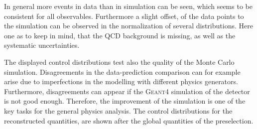 In general more events in data than in simulation can be seen, which seems to be consistent for all observables. Furthermore a slight offset, of the data points to the simulation can be observed in the normalization of several distributions.    
Here one as to keep in mind, that the QCD background is missing, as well as the systematic uncertainties.


The displayed control distributions test also the quality of the Monte Carlo simulation.
Disagreements in the data-prediction comparison can for example  arise due to imperfections in the  modelling  with different physics generators. Furthermore, disagreements can appear if the \textsc{Geant4} simulation of the detector is not good enough. Therefore, the improvement of the simulation is one of the key tasks for the general physics analysis. 
The control distributions for the reconstructed quantities, are shown after the global quantities of the preselection.





\clearpage

